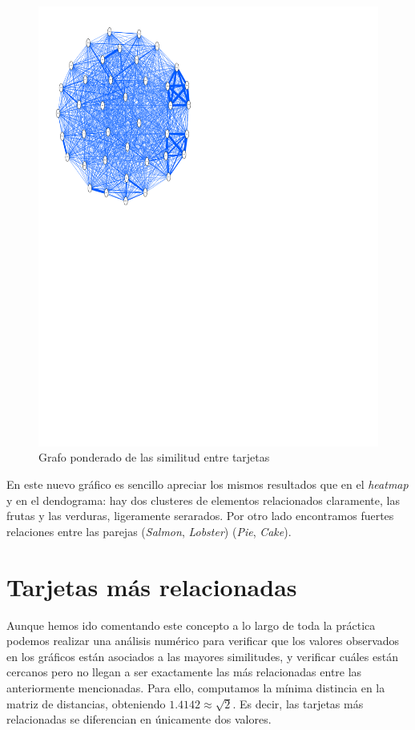 \documentclass[a4paper]{article}
\begin{document}
\begin{figure}[H]
	\includegraphics[scale=.6]{figures/dist}
	\centering
	\caption{Grafo ponderado de las similitud entre tarjetas}
\end{figure}

En este nuevo gráfico es sencillo apreciar los mismos resultados que en el \emph{heatmap} y en el dendograma: hay dos clusteres de elementos relacionados claramente, las frutas y las verduras, ligeramente serarados. Por otro lado encontramos fuertes relaciones entre las parejas (\emph{Salmon}, \emph{Lobster}) (\emph{Pie}, \emph{Cake}).

\section{Tarjetas más relacionadas}

Aunque hemos ido comentando este concepto a lo largo de toda la práctica podemos realizar una análisis numérico para verificar que los valores observados en los gráficos están asociados a las mayores similitudes, y verificar cuáles están cercanos pero no llegan a ser exactamente las más relacionadas entre las anteriormente mencionadas. Para ello, computamos la mínima distincia en la matriz de distancias, obteniendo $1.4142 \approx \sqrt{2}$. Es decir, las tarjetas más relacionadas se diferencian en únicamente dos valores. \\
\end{document}
